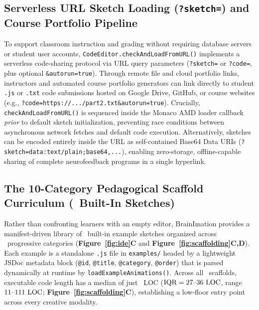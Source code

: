 \documentclass[10pt,twocolumn]{article}
\begin{document}
\subsection{Serverless URL Sketch Loading (\texttt{?sketch=}) and Course Portfolio Pipeline}
To support classroom instruction and grading without requiring database servers or student user accounts, \texttt{CodeEditor.checkAndLoadFromURL()} implements a serverless code-sharing protocol via URL query parameters (\texttt{?sketch=} or \texttt{?code=}, plus optional \texttt{\&autorun=true}). Through remote file and cloud portfolio links, instructors and automated course portfolio generators can link directly to student \texttt{.js} or \texttt{.txt} code submissions hosted on Google Drive, GitHub, or course websites (e.g., \texttt{?code=https://.../part2.txt\&autorun=true}). Crucially, \texttt{checkAndLoadFromURL()} is sequenced inside the Monaco AMD loader callback \emph{prior} to default sketch initialization, preventing race conditions between asynchronous network fetches and default code execution. Alternatively, sketches can be encoded entirely inside the URL as self-contained Base64 Data URIs (\texttt{?sketch=data:text/plain;base64,...}), enabling zero-storage, offline-capable sharing of complete neurofeedback programs in a single hyperlink.

\subsection{The 10-Category Pedagogical Scaffold Curriculum (\NBuiltinExamples\ Built-In Sketches)}
Rather than confronting learners with an empty editor, BrainImation provides a manifest-driven library of \NBuiltinExamples\ built-in example sketches organized across \NBuiltinCategories\ progressive categories (\textbf{Figure~\ref{fig:ide}C} and \textbf{Figure~\ref{fig:scaffolding}C,D}). Each example is a standalone \texttt{.js} file in \texttt{examples/} headed by a lightweight JSDoc metadata block (\texttt{@id}, \texttt{@title}, \texttt{@category}, \texttt{@order}) that is parsed dynamically at runtime by \texttt{loadExampleAnimations()}. Across all \NBuiltinExamples\ scaffolds, executable code length has a median of just \ExLOCMedian~LOC ($\text{IQR} = 27\text{--}36\text{ LOC}$, range $11\text{--}111\text{ LOC}$; \textbf{Figure~\ref{fig:scaffolding}C}), establishing a low-floor entry point across every creative modality.
\end{document}
